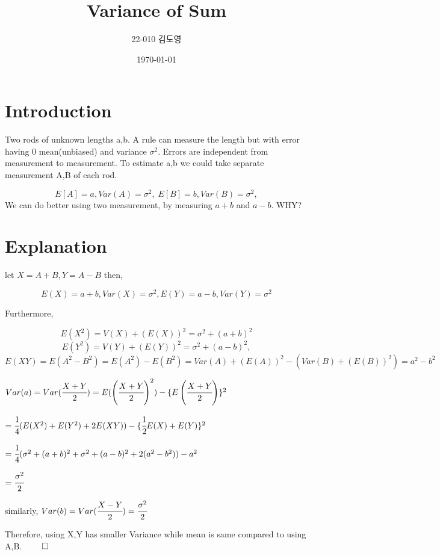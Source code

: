 \documentclass{article}
\title{Variance of Sum}
\author{22-010 김도영}
\date{\today}
\begin{document}
\maketitle

\section{Introduction}

Two rods of unknown lengths a,b. A rule can measure the length but with error having 0 mean(unbiased) and variance $\sigma ^2$. Errors are independent from measurement to measurement. To estimate a,b we could take separate measurement A,B of each rod. 

\[
E[A] = a, Var(A) = \sigma ^2, \; E[B] = b, Var(B) = \sigma ^2,  
\]
We can do better using two measurement, by measuring $a+b$ and $a-b$. WHY?

\section{Explanation}


let $ X = A+B , Y = A-B $ then,

\[E(X) = a+b, Var(X)= \sigma ^2, E(Y) = a-b, Var(Y) = \sigma ^2 \]

Furthermore, 

\[E(X^2)=V(X)+(E(X))^2=\sigma ^2 + (a+b)^2
\]
\[
E(Y^2)=V(Y)+(E(Y))^2=\sigma ^2 + (a-b)^2,
\]
\[
E(XY)= E(A^2-B^2)= E(A^2)-E(B^2)=Var(A)+(E(A))^2-(Var(B)+(E(B))^2)=a^2-b^2
\]


$
Var(a) = Var(\cfrac{X+Y}{2})= E(\left(\cfrac{X+Y}{2}\right)^2)-\{E\left(\cfrac{X+Y}{2}\right)\}^2
$

$
= \cfrac{1}{4} (E(X^2)+E(Y^2)+2E(XY))-\{\cfrac{1}{2} E(X)+E(Y) \}^2
$

$
= \cfrac{1}{4} (\sigma ^2 + (a+b)^2 + \sigma ^2 + (a-b)^2 +2(a^2-b^2))- a^2
$

$
=\cfrac{\sigma ^2}{2}
$

similarly, $Var(b)=Var(\cfrac{X-Y}{2})=\cfrac{\sigma ^2}{2}$

Therefore, using X,Y has smaller Variance while mean is same compared to using A,B. $\qed$
\end{document}
